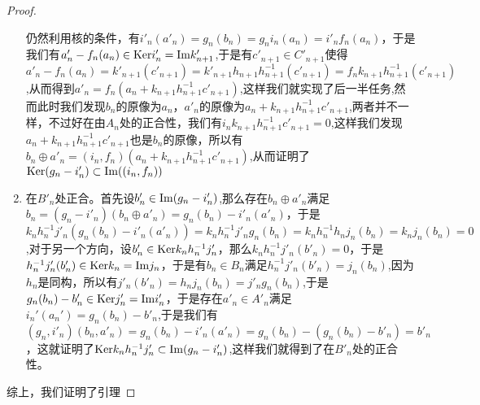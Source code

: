 \begin{proof}
\begin{enumerate}
    仍然利用核的条件，有$i'_{n}(a'_{n})=g_{n}(b_{n})=g_{n}i_{n}(a_{n})=i'_{n}f_{n}(a_{n})$，于是我们有$a'_{n}-f_{n}(a_{n})\in{\rm Ker} i'_{n}={\rm Im} k'_{n+1}$,于是有$c'_{n+1}\in C'_{n+1}$使得$a'_{n}-f_{n}(a_{n})=k'_{n+1}(c'_{n+1})=k'_{n+1}h_{n+1}h_{n+1}^{-1}(c'_{n+1})=f_{n}k_{n+1}h_{n+1}^{-1}(c'_{n+1})$,从而得到$a'_{n}=f_{n}(a_{n}+k_{n+1}h_{n+1}^{-1}c'_{n+1})$,这样我们就实现了后一半任务,然而此时我们发现$b_{n}$的原像为$a_{n}$，$a'_{n}$的原像为$a_{n}+k_{n+1}h_{n+1}^{-1}c'_{n+1}$,两者并不一样，不过好在由$A_{n}$处的正合性，我们有$i_{n}k_{n+1}h_{n+1}^{-1}c'_{n+1}=0$,这样我们发现$a_{n}+k_{n+1}h_{n+1}^{-1}c'_{n+1}$也是$b_{n}$的原像，所以有$b_{n}\oplus a'_{n}=(i_{n},f_{n})(a_{n}+k_{n+1}h_{n+1}^{-1}c'_{n+1})$,从而证明了${\rm Ker} (g_{n}-i'_{n})\subset {\rm Im}((i_{n},f_{n}))$
    \item 在$B'_{n}$处正合。首先设$b_{n}'\in {\rm Im}(g_{n}-i_{n}')$,那么存在$b_{n}\oplus a'_{n}$满足$b_{n}=(g_{n}-i'_{n})(b_{n}\oplus a'_{n})=g_{n}(b_{n})-i'_{n}(a'_{n})$，于是$k_{n}h_{n}^{-1}j'_{n}(g_{n}(b_{n})-i'_{n}(a'_{n}))=k_{n}h_{n}^{-1}j'_{n}g_{n}(b_{n})=k_{n}h_{n}^{-1}h_{n}j_{n}(b_{n})=k_{n}j_{n}(b_{n})=0$,对于另一个方向，设$b_{n}'\in {\rm Ker} k_{n}h_{n}^{-1}j'_{n}$，那么$k_{n}h_{n}^{-1}j'_{n}(b'_{n})=0$，于是$h_{n}^{-1}j'_{n}(b'_{n})\in{\rm Ker} k_{n}={\rm Im} j_{n}$，于是有$b_{n}\in B_{n}$满足$h_{n}^{-1}j'_{n}(b'_{n})=j_{n}(b_{n})$,因为$h_{n}$是同构，所以有$j'_{n}(b'_{n})=h_{n}j_{n}(b_{n})=j'_{n}g_{n}(b_{n})$,于是$g_{n}(b_{n})-b'_{n}\in{\rm Ker} j'_{n}={\rm Im} i'_{n}$，于是存在$a'_{n}\in A'_{n}$满足$i_{n}'(a_{n}')=g_{n}(b_{n})-b'_{n}$,于是我们有$(g_{n},i'_{n})(b_{n},a'_{n})=g_{n}(b_{n})-i'_{n}(a'_{n})=g_{n}(b_{n})-(g_{n}(b_{n})-b'_{n})=b'_{n}$，这就证明了${\rm Ker} k_{n}h_{n}^{-1}j'_{n}\subset {\rm Im} (g_{n}-i'_{n})$,这样我们就得到了在$B'_{n}$处的正合性。
    \end{enumerate}
    综上，我们证明了引理
\end{proof}
